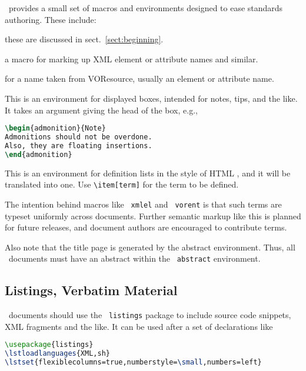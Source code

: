 \documentclass[11pt,a4paper]{ivoa}
\newcommand{\texword}[1]{\texttt{\color{texcolor} #1}}
\begin{document}
\ivoatex\ provides a small set of macros and environments designed
to ease standards authoring.  These include:

\begin{bigdescription}
\item[\texword{author}, \texword{previousversion}] these are discussed
in sect.~\ref{sect:beginning}.
\item[\texword{xmlel}] a macro for marking up XML element or attribute
names and similar.  
\item[\texword{vorent}] for a name taken from VOResource, usually an
element or attribute name.
\item[\texword{admonition}] This is an environment for 
displayed boxes, intended for notes, tips, and the like.  
It takes an argument giving the head of the box, e.g.,

\begin{lstlisting}[language=TeX]
\begin{admonition}{Note}
Admonitions should not be overdone.  
Also, they are floating insertions.
\end{admonition}
\end{lstlisting}
\item[\texword{bigdescription}] This is an environment for definition
lists in the style of HTML , and it will be translated into
one.  Use \verb|\item[term]| for the term to be defined.
\end{bigdescription}

The intention behind macros like \texword{xmlel} and \texword{vorent} is
that such terms are typeset uniformly across documents.  Further
semantic markup like this is planned for future releases, and document
authors are encouraged to contribute terms.

Also note that the title page is generated by the abstract environment.
Thus, all \ivoatex\ documents must have an abstract within the
\texword{abstract} environment.

\subsection{Listings, Verbatim Material}

\ivoatex\ documents should use the \texword{listings} package to include
source code snippets, XML fragments and the like.  It can be used after
a set of declarations like

\begin{lstlisting}[language=TeX]
\usepackage{listings}
\lstloadlanguages{XML,sh}
\lstset{flexiblecolumns=true,numberstyle=\small,numbers=left}
\end{lstlisting}
\end{document}
